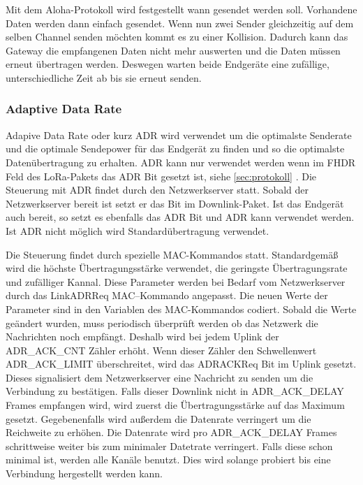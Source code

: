 \documentclass[a4paper, 12pt]{article}
\begin{document}
            Mit dem Aloha-Protokoll wird festgestellt wann gesendet werden soll. Vorhandene Daten werden dann einfach 
            gesendet. Wenn nun zwei Sender gleichzeitig auf dem selben Channel senden 
            möchten kommt es zu einer Kollision. Dadurch kann das Gateway die empfangenen Daten nicht mehr auswerten 
            und die Daten müssen erneut übertragen werden. Deswegen warten beide Endgeräte eine zufällige, 
            unterschiedliche Zeit ab bis sie erneut senden.

            \subsubsection{Adaptive Data Rate}\label{sec:ADR}
                Adapive Data Rate oder kurz ADR wird verwendet um die optimalste Senderate und die optimale 
                Sendepower für das Endgerät zu finden und so die optimalste Datenübertragung zu erhalten. ADR kann nur 
                verwendet werden wenn im FHDR Feld des LoRa-Pakets das ADR Bit gesetzt ist, siehe 
                \ref{sec:protokoll} . Die Steuerung mit ADR findet durch den Netzwerkserver statt. Sobald der 
                Netzwerkserver bereit ist setzt er das Bit im Downlink-Paket. Ist das Endgerät auch bereit, so 
                setzt es ebenfalls das ADR Bit und ADR kann verwendet werden. Ist ADR nicht möglich wird Standardübertragung 
                verwendet.

                Die Steuerung findet durch spezielle MAC-Kommandos statt. Standardgemäß wird die höchste 
                Übertragungsstärke verwendet, die geringste Übertragungsrate und zufälliger Kannal. Diese Parameter werden bei Bedarf 
                vom Netzwerkserver durch das LinkADRReq MAC–Kommando angepasst. Die 
                neuen Werte der Parameter sind in den Variablen des MAC-Kommandos codiert. Sobald die Werte geändert 
                wurden, muss periodisch überprüft werden ob das 
                Netzwerk die Nachrichten noch empfängt. Deshalb wird bei jedem Uplink der ADR\_ACK\_CNT Zähler erhöht. 
                Wenn dieser Zähler den Schwellenwert ADR\_ACK\_LIMIT
                überschreitet, wird das ADRACKReq Bit im Uplink gesetzt. Dieses signalisiert dem Netzwerkserver eine
                Nachricht zu senden um die Verbindung zu bestätigen. Falls dieser Downlink nicht in 
                ADR\_ACK\_DELAY Frames empfangen wird, wird zuerst die Übertragungsstärke auf das Maximum gesetzt. 
                Gegebenenfalls wird außerdem die Datenrate verringert um die Reichweite zu erhöhen. Die Datenrate wird 
                pro ADR\_ACK\_DELAY Frames schrittweise weiter bis zum minimaler Datetrate verringert. Falls diese schon 
                minimal ist, werden alle Kanäle benutzt. Dies wird solange probiert bis eine Verbindung 
                hergestellt werden kann. \cite[S.19 f]{LoRaSpec}         
\end{document}

